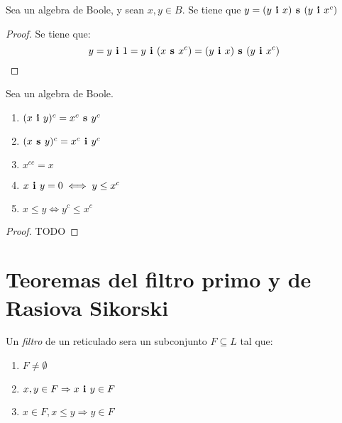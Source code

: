 \begin{lemma}
  Sea \algBoole un algebra de Boole, y sean $x, y \in B$. Se tiene que $y = (y\textbf{ i }x)\textbf{ s }(y\textbf{ i }x^c)$
\end{lemma}
\begin{proof}
  Se tiene que:
  $$
  y = y\textbf{ i }1 = y\textbf{ i }(x\textbf{ s }x^c) = (y\textbf{ i }x)\textbf{ s }(y\textbf{ i }x^c)
  $$
\end{proof}

\begin{theorem}
  Sea \algBoole un algebra de Boole.
  \begin{enumerate}
    \item $(x\textbf{ i }y)^c = x^c\textbf{ s }y^c$
    \item $(x\textbf{ s }y)^c = x^c\textbf{ i }y^c$
    \item $x^{cc} = x$
    \item $x\textbf{ i }y = 0 \iff y \leq x^c$
    \item $x\leq y \iff y^c \leq x^c$
  \end{enumerate}
\end{theorem}
\begin{proof}
  TODO
\end{proof}

\section{Teoremas del filtro primo y de Rasiova Sikorski}
\begin{definition}
  Un \emph{filtro} de un reticulado \reticulAlg sera un subconjunto $F \subseteq L$ tal que:
  \begin{enumerate}
    \item $F \neq \emptyset$
    \item $x, y \in F \Rightarrow x\textbf{ i }y \in F$
    \item $x \in F, x \leq y \Rightarrow y \in F$
  \end{enumerate}
\end{definition}


